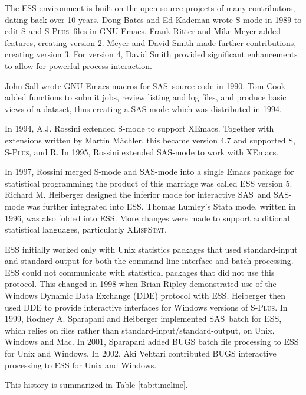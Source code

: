 \documentclass{article}
\newcommand*{\SAS}{\textsc{SAS}}
\newcommand*{\Splus}{\textsc{S-Plus}}
\newcommand*{\XLispStat}{\textsc{XLispStat}}
\begin{document}
The ESS environment is built on the open-source projects of many
contributors, dating back over 10 years.  Doug Bates and Ed Kademan
wrote S-mode in 1989 to edit S and \Splus\ files in GNU Emacs.  Frank
Ritter and Mike Meyer added features, creating version 2.  Meyer and
David Smith made further contributions, creating version 3.  For
version 4, David Smith provided significant enhancements to allow for
powerful process interaction.

John Sall wrote GNU Emacs macros for \SAS\ source code in 1990.
Tom Cook added functions to submit jobs, review listing and log files,
and produce basic views of a dataset, thus creating a SAS-mode which was
distributed in 1994.

In 1994, A.J. Rossini extended S-mode to support XEmacs.  Together
with extensions written by Martin M{\"a}chler, this became version
4.7 and supported S, \Splus, and R.
In 1995, Rossini extended SAS-mode to work with XEmacs.

In 1997, Rossini merged S-mode and SAS-mode into a single Emacs
package for statistical programming; the product of this marriage was
called ESS version 5.  Richard M. Heiberger designed the inferior mode
for interactive \SAS\ and SAS-mode was further integrated into ESS.
Thomas Lumley's Stata mode, written in 1996, was also folded into
ESS.  More changes were made to support additional statistical
languages, particularly \XLispStat.

ESS initially worked only with Unix statistics packages that used
standard-input and standard-output for both the command-line interface
and batch processing.  ESS could not communicate with statistical
packages that did not use this protocol.  This changed in 1998 when
Brian Ripley demonstrated use of the Windows Dynamic Data Exchange
(DDE) protocol with ESS.  Heiberger then used DDE to provide
interactive interfaces for Windows versions of \Splus.  In 1999,
Rodney A. Sparapani and Heiberger implemented \SAS\ batch for ESS, which
relies on files rather than standard-input/standard-output, on Unix,
Windows and Mac.  In 2001, Sparapani added BUGS batch file processing
to ESS for Unix and Windows.  In 2002, Aki Vehtari contributed BUGS
interactive processing to ESS for Unix and Windows.

This history is summarized in Table \ref{tab:timeline}.
\end{document}
